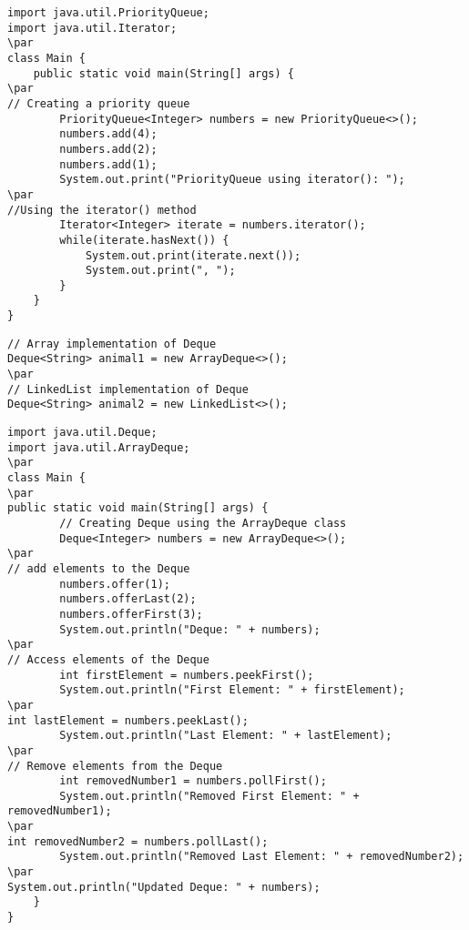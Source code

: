 \documentclass{book}
\def\lthtmlcheckvsize{\ifdim\ht\sizebox<\vsize 
  \ifdim\wd\sizebox<\hsize\expandafter\hfill\fi \expandafter\vfill
  \else\expandafter\vss\fi}%
\begin{document}
{\newpage\clearpage
{}%
\begin{lstlisting}
import java.util.PriorityQueue;
import java.util.Iterator;
\par
class Main {
    public static void main(String[] args) {
\par
// Creating a priority queue
        PriorityQueue<Integer> numbers = new PriorityQueue<>();
        numbers.add(4);
        numbers.add(2);
        numbers.add(1);
        System.out.print("PriorityQueue using iterator(): ");
\par
//Using the iterator() method
        Iterator<Integer> iterate = numbers.iterator();
        while(iterate.hasNext()) {
            System.out.print(iterate.next());
            System.out.print(", ");
        }
    }
}
\end{lstlisting}%
\lthtmlfigureZ
\lthtmlcheckvsize\clearpage}

{\newpage\clearpage
{}%
\begin{lstlisting}
// Array implementation of Deque
Deque<String> animal1 = new ArrayDeque<>();
\par
// LinkedList implementation of Deque
Deque<String> animal2 = new LinkedList<>();
\end{lstlisting}%
\lthtmlfigureZ
\lthtmlcheckvsize\clearpage}

{\newpage\clearpage
{}%
\begin{lstlisting}
import java.util.Deque;
import java.util.ArrayDeque;
\par
class Main {
\par
public static void main(String[] args) {
        // Creating Deque using the ArrayDeque class
        Deque<Integer> numbers = new ArrayDeque<>();
\par
// add elements to the Deque
        numbers.offer(1);
        numbers.offerLast(2);
        numbers.offerFirst(3);
        System.out.println("Deque: " + numbers);
\par
// Access elements of the Deque
        int firstElement = numbers.peekFirst();
        System.out.println("First Element: " + firstElement);
\par
int lastElement = numbers.peekLast();
        System.out.println("Last Element: " + lastElement);
\par
// Remove elements from the Deque
        int removedNumber1 = numbers.pollFirst();
        System.out.println("Removed First Element: " + removedNumber1);
\par
int removedNumber2 = numbers.pollLast();
        System.out.println("Removed Last Element: " + removedNumber2);
\par
System.out.println("Updated Deque: " + numbers);
    }
}
\end{lstlisting}%
\lthtmlfigureZ
\lthtmlcheckvsize\clearpage}
\end{document}
